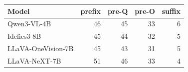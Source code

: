 \begin{tabular}{lrrrr}
\toprule
Model & prefix & pre-Q & pre-O & suffix \\
\midrule
Qwen3-VL-4B & 46 & 45 & 33 & 6 \\
Idefics3-8B & 45 & 44 & 32 & 5 \\
LLaVA-OneVision-7B & 45 & 43 & 31 & 5 \\
LLaVA-NeXT-7B & 51 & 46 & 33 & 4 \\
\bottomrule
\end{tabular}
